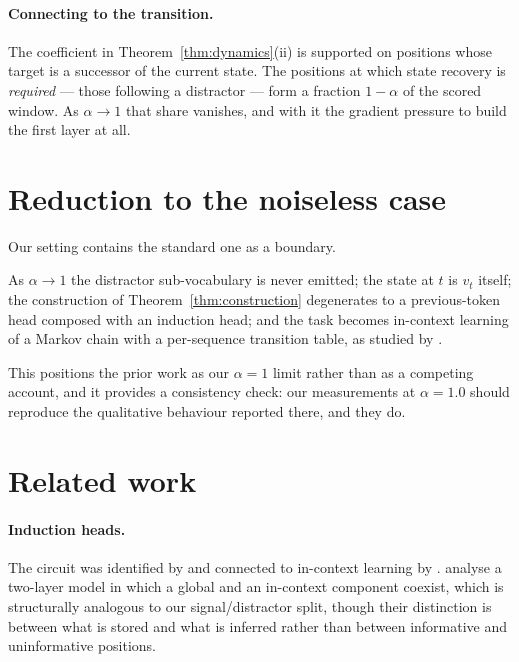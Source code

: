 \paragraph{Connecting to the transition.}
The coefficient in Theorem~\ref{thm:dynamics}(ii) is supported on positions whose target is a
successor of the current state. The positions at which state recovery is \emph{required} --- those
following a distractor --- form a fraction $1-\alpha$ of the scored window. As $\alpha\to1$ that
share vanishes, and with it the gradient pressure to build the first layer at all.

\section{Reduction to the noiseless case}
\label{sec:reduction}

Our setting contains the standard one as a boundary.

\begin{theorem}[Reduction]
\label{thm:reduction}
As $\alpha\to1$ the distractor sub-vocabulary is never emitted; the state at $t$ is $v_t$ itself;
the construction of Theorem~\ref{thm:construction} degenerates to a previous-token head composed
with an induction head; and the task becomes in-context learning of a Markov chain with a
per-sequence transition table, as studied by \citet{edelman2024}.
\end{theorem}

This positions the prior work as our $\alpha=1$ limit rather than as a competing account, and it
provides a consistency check: our measurements at $\alpha=1.0$ should reproduce the qualitative
behaviour reported there, and they do.

\section{Related work}
\label{sec:related}

\paragraph{Induction heads.}
The circuit was identified by \citet{elhage2021} and connected to in-context learning by
\citet{olsson2022}. \citet{bietti2023} analyse a two-layer model in which a global and an
in-context component coexist, which is structurally analogous to our signal/distractor split,
though their distinction is between what is stored and what is inferred rather than between
informative and uninformative positions.

